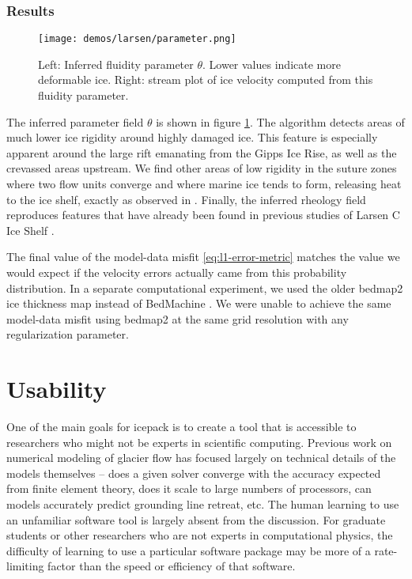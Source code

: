 \documentclass[journal abbreviation, manuscript]{copernicus}
\begin{document}
\subsubsection{Results}

\begin{figure}[h]
    \texttt{[image: demos/larsen/parameter.png]}
    \caption{Left: Inferred fluidity parameter $\theta$.
    Lower values indicate more deformable ice.
    Right: stream plot of ice velocity computed from this fluidity parameter.}
    \label{fig:larsen}
\end{figure}

The inferred parameter field $\theta$ is shown in figure \ref{fig:larsen}.
The algorithm detects areas of much lower ice rigidity around highly damaged ice.
This feature is especially apparent around the large rift emanating from the Gipps Ice Rise, as well as the crevassed areas upstream.
We find other areas of low rigidity in the suture zones where two flow units converge and where marine ice tends to form, releasing heat to the ice shelf, exactly as observed in \citet{holland2009marine}.
Finally, the inferred rheology field reproduces features that have already been found in previous studies of Larsen C Ice Shelf \citep{khazendar2011acceleration}.

The final value of the model-data misfit \eqref{eq:l1-error-metric} matches the value we would expect if the velocity errors actually came from this probability distribution.
In a separate computational experiment, we used the older bedmap2 ice thickness map instead of BedMachine \citep{fretwell2013bedmap2}.
We were unable to achieve the same model-data misfit using bedmap2 at the same grid resolution with any regularization parameter.


\section{Usability}

One of the main goals for icepack is to create a tool that is accessible to researchers who might not be experts in scientific computing.
Previous work on numerical modeling of glacier flow has focused largely on technical details of the models themselves -- does a given solver converge with the accuracy expected from finite element theory, does it scale to large numbers of processors, can models accurately predict grounding line retreat, etc.
The human learning to use an unfamiliar software tool is largely absent from the discussion.
For graduate students or other researchers who are not experts in computational physics, the difficulty of learning to use a particular software package may be more of a rate-limiting factor than the speed or efficiency of that software.
\end{document}
